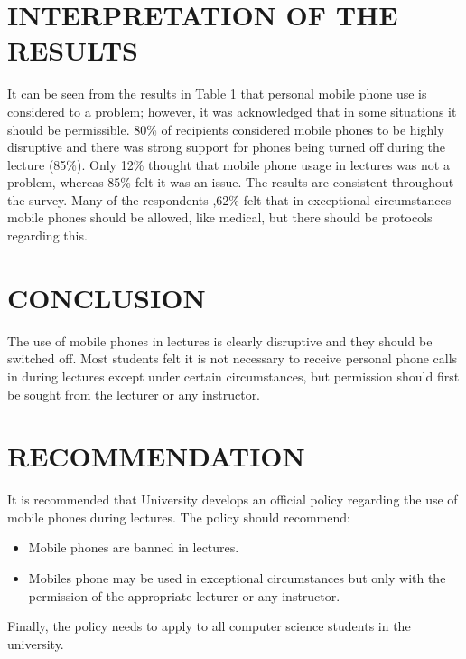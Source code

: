 \documentclass{article}
\begin{document}
\section{INTERPRETATION OF THE RESULTS}\label{sec:into}
It can be seen from the results in Table 1 that personal mobile phone use is considered
to a problem; however, it was acknowledged that in some situations it should be
permissible. 80\% of recipients considered mobile phones to be highly disruptive and
there was strong support for phones being turned off during the lecture (85\%). Only 12\%
thought that mobile phone usage in lectures was not a problem,
whereas 85\% felt it was an issue. The results are consistent throughout the survey.
Many of the respondents ,62\%  felt that in exceptional circumstances mobile phones
should be allowed, like medical, but there should be protocols regarding this.



\section{CONCLUSION}\label{sec:into}
The use of mobile phones in lectures is clearly disruptive and they should be
switched off. Most students felt it is not necessary to receive personal phone calls in during lectures except under certain circumstances, but permission should first be sought
from the lecturer or any instructor.



\section{RECOMMENDATION}\label{sec:into}
It is recommended that University develops an official policy regarding the use of mobile
phones during lectures. The policy should recommend:

	\begin{itemize}
   	  \item Mobile phones are banned in lectures.
	  \item Mobiles phone may be used in exceptional circumstances but only with the
permission of the appropriate lecturer or any instructor.
	\end{itemize}


Finally, the policy needs to apply to all computer science students in the university.
\end{document}
